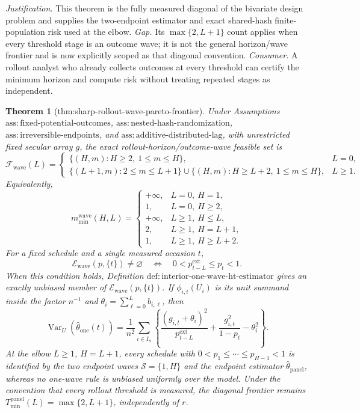 \documentclass{article}
\newtheorem{theorem}{Theorem}
\begin{document}
\par\smallskip\noindent \textit{Justification.} This theorem is the fully measured diagonal of the bivariate design problem and supplies the two-endpoint estimator and exact shared-hash finite-population risk used at the elbow. \textit{Gap.} Its \(\max\{2,L+1\}\) count applies when every threshold stage is an outcome wave; it is not the general horizon/wave frontier and is now explicitly scoped as that diagonal convention. \textit{Consumer.} A rollout analyst who already collects outcomes at every threshold can certify the minimum horizon and compute risk without treating repeated stages as independent.

\begin{theorem}[thm:sharp-rollout-wave-pareto-frontier]\label{thm:sharp-rollout-wave-pareto-frontier}
Under Assumptions \(\mathrm{ass:fixed\text{-}potential\text{-}outcomes}\), \(\mathrm{ass:nested\text{-}hash\text{-}randomization}\), \(\mathrm{ass:irreversible\text{-}endpoints}\), and \(\mathrm{ass:additive\text{-}distributed\text{-}lag}\), with unrestricted fixed secular array \(g\), the exact rollout-horizon/outcome-wave feasible set is
\[
 \mathcal F_{\mathrm{wave}}(L)=
 \begin{cases}
 \{(H,m):H\geq2,\ 1\leq m\leq H\},&L=0,\\
 \{(L+1,m):2\leq m\leq L+1\}
 \mathbin{\cup}
 \{(H,m):H\geq L+2,\ 1\leq m\leq H\},&L\geq1.
 \end{cases}
\]
Equivalently,
\[
 m_{\min}^{\mathrm{wave}}(H,L)=
 \begin{cases}
 +\infty,&L=0,\ H=1,\\
 1,&L=0,\ H\geq2,\\
 +\infty,&L\geq1,\ H\leq L,\\
 2,&L\geq1,\ H=L+1,\\
 1,&L\geq1,\ H\geq L+2.
 \end{cases}
\]
For a fixed schedule and a single measured occasion \(t\),
\[
 \mathcal E_{\mathrm{wave}}(p,\{t\})\ne\varnothing
 \quad\Longleftrightarrow\quad
 0<p^{\mathrm{ext}}_{t-L}\leq p_t<1.
\]
When this condition holds, Definition \(\mathrm{def:interior\text{-}one\text{-}wave\text{-}ht\text{-}estimator}\) gives an exactly unbiased member of \(\mathcal E_{\mathrm{wave}}(p,\{t\})\).  If \(\phi_{i,t}(U_i)\) is its unit summand inside the factor \(n^{-1}\) and \(\theta_i=\sum_{\ell=0}^{L}b_{i,\ell}\), then
\[
 \operatorname{Var}_U\!\left(\widehat\theta_{\mathrm{one}}(t)\right)
 =\frac1{n^2}\sum_{i\in I_n}
 \left\{
 \frac{(g_{i,t}+\theta_i)^2}{p^{\mathrm{ext}}_{t-L}}
 +\frac{g_{i,t}^2}{1-p_t}-\theta_i^2
 \right\}.
\]
At the elbow \(L\geq1\), \(H=L+1\), every schedule with \(0<p_1\leq\cdots\leq p_{H-1}<1\) is identified by the two endpoint waves \(\mathcal S=\{1,H\}\) and the endpoint estimator \(\widehat\theta_{\mathrm{panel}}\), whereas no one-wave rule is unbiased uniformly over the model.  Under the convention that every rollout threshold is measured, the diagonal frontier remains \(T_{\min}^{\mathrm{panel}}(L)=\max\{2,L+1\}\), independently of \(r\).
\end{theorem}
\end{document}

